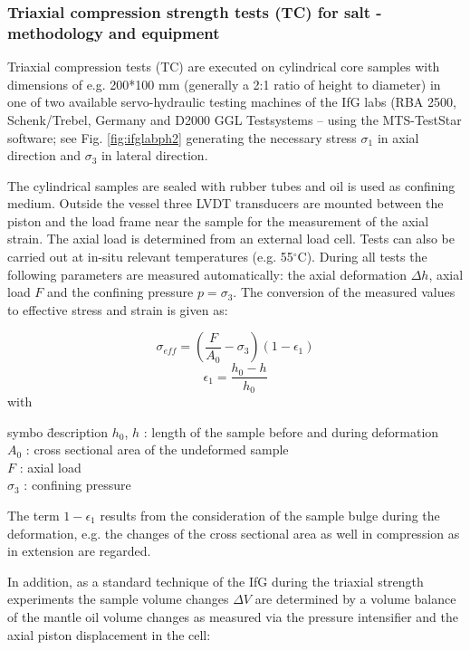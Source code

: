 \subsubsection{Triaxial compression strength tests (TC) for salt - methodology and equipment}

Triaxial compression tests (TC) are executed on cylindrical core samples with dimensions of e.g. 200*100 mm (generally a 2:1 ratio of height to diameter) in one of two available servo-hydraulic testing machines of the IfG labs (RBA 2500, Schenk/Trebel, Germany and D2000 GGL Testsystems – using the MTS-TestStar software; see Fig. \ref{fig:ifglabph2} generating the necessary stress $\sigma_1$ in axial direction and $\sigma_3$ in lateral direction.

The cylindrical samples are sealed with rubber tubes and oil is used as confining medium. Outside the vessel three LVDT transducers are mounted between the piston and the load frame near the sample for the measurement of the axial strain. The axial load is determined from an external load cell. Tests can also be carried out at in-situ relevant temperatures (e.g. 55$^\circ$C). During all tests the following parameters are measured automatically: the axial deformation $\Delta h$, axial load $F$ and the confining pressure $p = \sigma_3$. The conversion of the measured values to effective stress and strain is given as:

\begin{equation}
\sigma_{eff} = \left(  \frac{F}{A_0}-\sigma_3 \right) (1-\epsilon_1)
\end{equation}
\begin{equation}
\epsilon_1 = \frac{h_0-h}{h_0}
\end{equation}
with
\begin{tabbing}
symbo \= description \kill
$h_0$, $h$ : \> length of the sample before and during deformation \\
$A_0$ : \> cross sectional area of the undeformed sample \\
$F$ : \> axial load  \\
$\sigma_3$ : \> confining pressure 
\end{tabbing}

The term $1-\epsilon_1$ results from the consideration of the sample bulge during the deformation, e.g. the changes of the cross sectional area as well in compression as in extension are regarded.

In addition, as a standard technique of the IfG during the triaxial strength experiments the sample volume changes $\Delta V$ are determined by a volume balance of the mantle oil volume changes as measured via the pressure intensifier and the axial piston displacement in the cell:

